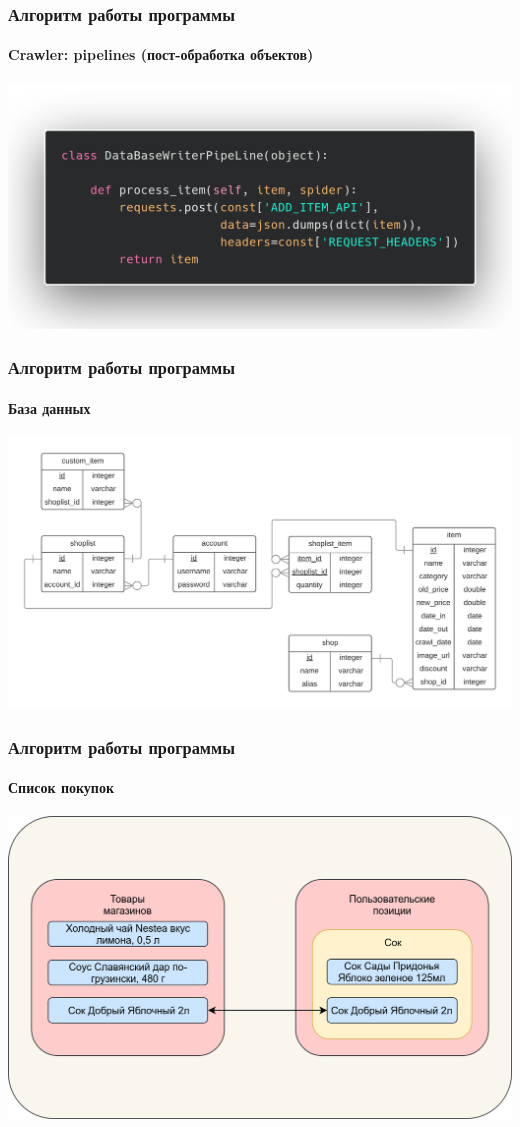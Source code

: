 \documentclass{beamer}
\begin{document}
\begin{frame}
    \frametitle{Алгоритм работы программы}
    \framesubtitle{Crawler: pipelines (пост-обработка объектов)}
    \begin{center}
        \includegraphics[width=0.9\columnwidth]{code_pipeline.png}
    \end{center}
\end{frame}

\begin{frame}
    \frametitle{Алгоритм работы программы}
    \framesubtitle{База данных}
    \medskip
    \begin{center}
      \includegraphics[width=\linewidth]{database}
    \end{center}
\end{frame}

\begin{frame}
    \frametitle{Алгоритм работы программы}
    \framesubtitle{Список покупок}
    \medskip
    \begin{center}
      \includegraphics[width=\linewidth]{shoplist}
    \end{center}
\end{frame}
\end{document}
